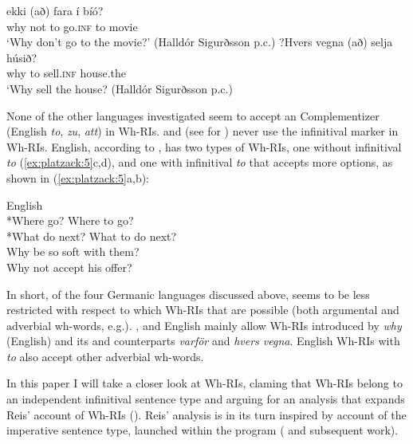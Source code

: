 \documentclass[output=paper]{LSP/langsci}
\begin{document}
   \ex
{} ekki (að)  fara   í     bíó?      \\
      why        not   to    go.\textsc{inf} to  movie\\
\glt   ‘Why don’t go to the movie?’   (Halldór Sigurðsson p.c.)
\ex
\gll ?{Hvers vegna} (að)   selja     húsið?    \\
       why        to    sell.\textsc{inf}  house.the  \\
       \glt ‘Why sell the house?    (Halldór Sigurðsson p.c.)
\z
\z

None of the other languages investigated seem to accept an  Complementizer (English \textit{to},  \textit{zu},  \textit{att}) in Wh-RIs.  and  (see \citealt[156]{Reis2003} for ) never use the infinitival marker in Wh-RIs. English, according to \citet[875]{HuddlestonPullum2003}, has two types of Wh-RIs, one without infinitival \textit{to} (\ref{ex:platzack:5}c,d), and one with infinitival \textit{to} that accepts more options, as shown in (\ref{ex:platzack:5}a,b):

\ea%
    \label{ex:platzack:5}
	    English  \\
   \ea
 *{Where go}?    {Where to go}?\\
\ex
*{What do next}?    {What to do next}?\\
   \ex
 {Why be so soft with them}?\\
   \ex
 {Why not accept his offer}?\\
\z
\z

In short, of the four Germanic languages discussed above,  seems to be less restricted with respect to which Wh-RIs that are possible (both argumental and adverbial wh-words, e.g.). ,  and English mainly allow Wh-RIs introduced by \textit{why} (English) and its  and  counterparts \textit{varför} and \textit{hvers vegna}. English Wh-RIs with \textit{to} also accept other adverbial wh-words. 

  In this paper I will take a closer look at  Wh-RIs, claming that Wh-RIs belong to an independent infinitival sentence type and arguing for an analysis that expands Reis’ account of  Wh-RIs (\citeyear{Reis2003}). Reis’ analysis is in its turn inspired by  account of the imperative sentence type, launched within the  program (\citealt{Chomsky1995} and subsequent work).
\end{document}

